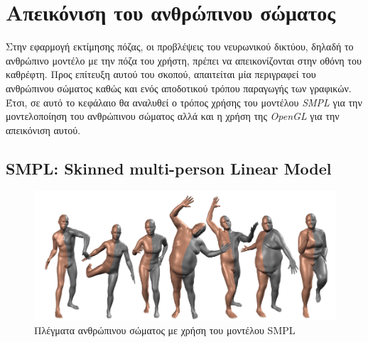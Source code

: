 
\section{Απεικόνιση του ανθρώπινου σώματος}
\label{section:opengl_shading_language}

Στην εφαρμογή εκτίμησης πόζας, οι προβλέψεις του νευρωνικού δικτύου, δηλαδή το ανθρώπινο μοντέλο με την πόζα του χρήστη, πρέπει να απεικονίζονται στην οθόνη του καθρέφτη. Προς επίτευξη αυτού του σκοπού, απαιτείται μία περιγραφεί του ανθρώπινου σώματος καθώς και ενός αποδοτικού τρόπου παραγωγής των γραφικών. Έτσι, σε αυτό το κεφάλαιο θα αναλυθεί ο τρόπος χρήσης του μοντέλου \textsl{SMPL} για την μοντελοποίηση του ανθρώπινου σώματος αλλά και η χρήση της \textsl{OpenGL} για την απεικόνιση αυτού.

\subsection{SMPL: Skinned multi-person Linear Model}
\label{sec:smpl}

\begin{figure}[h]
	\centering
	\includegraphics[scale=0.4]{images/chapter3/smpl_many_meshes.png}
	\caption{Πλέγματα ανθρώπινου σώματος με χρήση του μοντέλου SMPL}
\end{figure}

